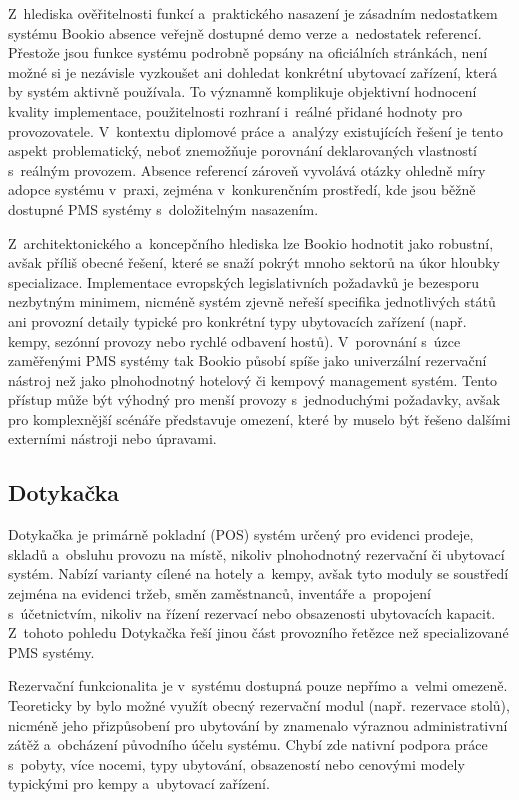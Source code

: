 Z~hlediska ověřitelnosti funkcí a~praktického nasazení je zásadním nedostatkem systému Bookio absence veřejně dostupné demo verze a~nedostatek referencí.
Přestože jsou funkce systému podrobně popsány na oficiálních stránkách, není možné si je nezávisle vyzkoušet ani dohledat konkrétní ubytovací zařízení, která by systém aktivně používala.
To významně komplikuje objektivní hodnocení kvality implementace, použitelnosti rozhraní i~reálné přidané hodnoty pro provozovatele.
V~kontextu diplomové práce a~analýzy existujících řešení je tento aspekt problematický, neboť znemožňuje porovnání deklarovaných vlastností s~reálným provozem.
Absence referencí zároveň vyvolává otázky ohledně míry adopce systému v~praxi, zejména v~konkurenčním prostředí, kde jsou běžně dostupné PMS systémy s~doložitelným nasazením.

Z~architektonického a~koncepčního hlediska lze Bookio hodnotit jako robustní, avšak příliš obecné řešení, které se snaží pokrýt mnoho sektorů na úkor hloubky specializace.
Implementace evropských legislativních požadavků je bezesporu nezbytným minimem, nicméně systém zjevně neřeší specifika jednotlivých států ani provozní detaily typické pro konkrétní typy ubytovacích zařízení (např. kempy, sezónní provozy nebo rychlé odbavení hostů).
V~porovnání s~úzce zaměřenými PMS systémy tak Bookio působí spíše jako univerzální rezervační nástroj než jako plnohodnotný hotelový či kempový management systém.
Tento přístup může být výhodný pro menší provozy s~jednoduchými požadavky, avšak pro komplexnější scénáře představuje omezení, které by muselo být řešeno dalšími externími nástroji nebo úpravami.

\subsection{Dotykačka}
Dotykačka je primárně pokladní (POS) systém určený pro evidenci prodeje, skladů a~obsluhu provozu na místě, nikoliv plnohodnotný rezervační či ubytovací systém.
Nabízí varianty cílené na hotely a~kempy, avšak tyto moduly se soustředí zejména na evidenci tržeb, směn zaměstnanců, inventáře a~propojení s~účetnictvím, nikoliv na řízení rezervací nebo obsazenosti ubytovacích kapacit.
Z~tohoto pohledu Dotykačka řeší jinou část provozního řetězce než specializované PMS systémy.

Rezervační funkcionalita je v~systému dostupná pouze nepřímo a~velmi omezeně.
Teoreticky by bylo možné využít obecný rezervační modul (např. rezervace stolů), nicméně jeho přizpůsobení pro ubytování by znamenalo výraznou administrativní zátěž a~obcházení původního účelu systému.
Chybí zde nativní podpora práce s~pobyty, více nocemi, typy ubytování, obsazeností nebo cenovými modely typickými pro kempy a~ubytovací zařízení.

